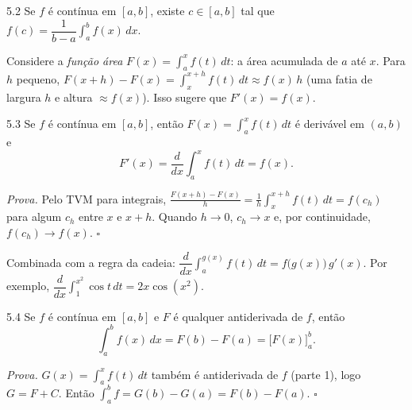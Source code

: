 \begin{teorema}{5.2}
Se $f$ é contínua em $[a,b]$, existe $c\in[a,b]$ tal que $f(c)=\dfrac1{b-a}\displaystyle\int_a^bf(x)\,dx$.
\end{teorema}

Considere a \emph{função área} $F(x)=\int_a^xf(t)\,dt$: a área acumulada de $a$ até $x$. Para
$h$ pequeno, $F(x+h)-F(x)=\int_x^{x+h}f(t)\,dt\approx f(x)\,h$ (uma fatia de largura $h$ e
altura $\approx f(x)$). Isso sugere que $F'(x)=f(x)$.


\begin{teorema}{5.3}
Se $f$ é contínua em $[a,b]$, então $F(x)=\int_a^xf(t)\,dt$ é derivável em $(a,b)$ e
\[
F'(x)=\frac{d}{dx}\int_a^xf(t)\,dt=f(x).
\]
\end{teorema}
\emph{Prova.} Pelo TVM para integrais, $\frac{F(x+h)-F(x)}h=\frac1h\int_x^{x+h}f(t)\,dt=f(c_h)$
para algum $c_h$ entre $x$ e $x+h$. Quando $h\to0$, $c_h\to x$ e, por continuidade,
$f(c_h)\to f(x)$. $\square$

Combinada com a regra da cadeia:
$\dfrac{d}{dx}\displaystyle\int_a^{g(x)}f(t)\,dt=f\big(g(x)\big)\,g'(x)$. Por exemplo,
$\dfrac{d}{dx}\displaystyle\int_1^{x^2}\cos t\,dt=2x\cos(x^2)$.

\begin{teorema}{5.4}
Se $f$ é contínua em $[a,b]$ e $F$ é qualquer antiderivada de $f$, então
\[
\int_a^bf(x)\,dx=F(b)-F(a)=\Big[F(x)\Big]_a^b .
\]
\end{teorema}
\emph{Prova.} $G(x)=\int_a^xf(t)\,dt$ também é antiderivada de $f$ (parte 1), logo
$G=F+C$. Então $\int_a^bf=G(b)-G(a)=F(b)-F(a)$. $\square$

